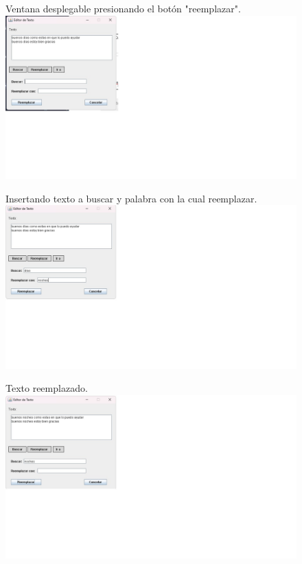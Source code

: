\documentclass{article}
\begin{document}
	\begin{figure}[H]
        \centering
		Ventana desplegable presionando el botón "reemplazar".
        \includegraphics[width=2.5\textwidth,keepaspectratio]{img/reemplazar1.jpg}
    \end{figure}
	\begin{figure}[H]
        \centering
		Insertando texto a buscar y palabra con la cual reemplazar.
        \includegraphics[width=2.5\textwidth,keepaspectratio]{img/reemplazar2.jpg}
    \end{figure}
	\begin{figure}[H]
        \centering
		Texto reemplazado.
        \includegraphics[width=2.5\textwidth,keepaspectratio]{img/reemplazar3.jpg}
    \end{figure}
	
\end{document}
